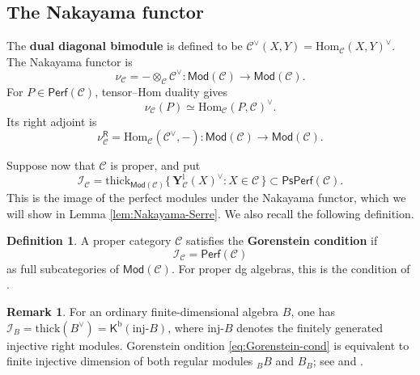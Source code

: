 \documentclass[11pt,letterpaper,reqno]{amsart}
\theoremstyle{plain}
\theoremstyle{definition}
\newtheorem{definition}[definition]{Definition}
\newtheorem{remark}[remark]{Remark}
\theoremstyle{plain}
\theoremstyle{definition}
\numberwithin{equation}{section}
\begin{document}
\subsection{The Nakayama functor}

The \textbf{dual diagonal bimodule} is defined to be $\mathscr C^\vee(X,Y)=\mathrm{Hom}_{\mathscr C}(X,Y)^\vee$.
The Nakayama functor is
\begin{equation}\label{eq:Nakayama-functor}
\nu_{\mathscr C}=-\otimes_{\mathscr C} \mathscr C^\vee:
\mathsf{Mod}(\mathscr C)\longrightarrow\mathsf{Mod}(\mathscr C).
\end{equation}
For $P\in\mathsf{Perf}(\mathscr C)$, tensor--Hom duality gives
\[
\nu_{\mathscr C}(P)\simeq\mathrm{Hom}_{\mathscr C}(P,\mathscr C)^\vee.
\]
Its right adjoint is
\begin{equation}\label{eq:Nakayama-functor-right-adjoint}
\nu_{\mathscr{C}}^{\mathsf{R}}=\mathrm{Hom}_{\mathscr{C}}(\mathscr{C}^\vee,-) : \mathsf{Mod}(\mathscr{C}) \longrightarrow \mathsf{Mod}(\mathscr{C}).
\end{equation}

Suppose now that $\mathscr C$ is proper, and put
\begin{equation}\label{eq:Nakayama-image}
\mathscr I_{\mathscr C}
=\mathrm{thick}_{\mathsf{Mod}(\mathscr C)}
\{\,\mathbf Y_{\mathscr C}^{\mathrm l}(X)^\vee:X\in\mathscr C\,\}
\subset\mathsf{PsPerf}(\mathscr C).
\end{equation}
This is the image of the perfect modules under the Nakayama functor, which we will show in Lemma \ref{lem:Nakayama-Serre}.
We also recall the following definition.

\begin{definition}\label{def:Gorenstein}
A proper category $\mathscr C$ satisfies the \textbf{Gorenstein condition} if
\begin{equation}\label{eq:Gorenstein-cond}
\mathscr I_{\mathscr C}=\mathsf{Perf}(\mathscr C)
\end{equation}
as full subcategories of $\mathsf{Mod}(\mathscr C)$.
For proper dg algebras, this is the condition of \cite[Definition 5.2]{Goodbody2024}.
\end{definition}

\begin{remark}
For an ordinary finite-dimensional algebra $B$, one has $\mathscr I_B=\mathrm{thick}(B^\vee)=\mathsf K^{\mathrm b}(\mathrm{inj}\text{-}B)$, where $\mathrm{inj}\text{-}B$ denotes the finitely generated injective right modules.
Gorenstein ondition \eqref{eq:Gorenstein-cond} is equivalent to finite injective dimension of both regular modules ${}_BB$ and $B_B$; see \cite[Corollary 3.9]{Chen2011} and \cite[Remark 5.3]{Goodbody2024}.
\end{remark}
\end{document}
